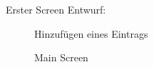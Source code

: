 \documentclass[
    DIV12,
    cleardouble=plain,
    headings=normal,
    pdftex,
    headexclude,footexclude,
    final
]{scrreprt}
\begin{document}
Erster Screen Entwurf:

\begin{figure}[ht]
	\centering
	\caption{Hinzufügen eines Eintrags}
	\label{fig1}
\end{figure}


\begin{figure}[ht]
	\centering
	\caption{Main Screen}
	\label{fig2}
\end{figure}
\end{document}
